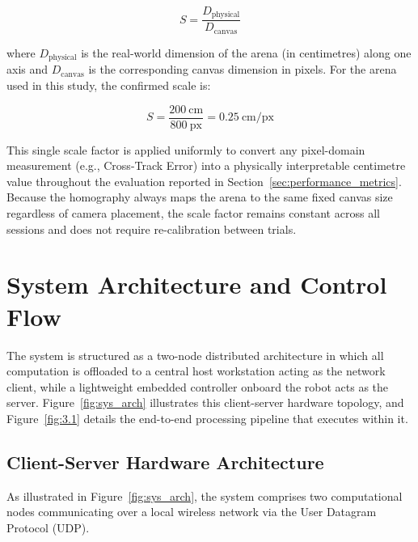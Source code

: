 \begin{equation}
    S = \frac{D_{\text{physical}}}{D_{\text{canvas}}}
    \label{eq:px_cm_scale}
\end{equation}

\noindent where $D_{\text{physical}}$ is the real-world dimension of the arena (in centimetres) along one axis
and $D_{\text{canvas}}$ is the corresponding canvas dimension in pixels. For the arena used in
this study, the confirmed scale is:

\begin{equation}
    S = \frac{200\ \text{cm}}{800\ \text{px}} = 0.25\ \text{cm/px}
    \label{eq:px_cm_value}
\end{equation}

This single scale factor is applied uniformly to convert any pixel-domain measurement
(e.g., Cross-Track Error) into a physically interpretable centimetre value throughout
the evaluation reported in Section~\ref{sec:performance_metrics}. Because the homography
always maps the arena to the same fixed canvas size regardless of camera placement, the
scale factor remains constant across all sessions and does not require re-calibration
between trials.

\section{System Architecture and Control Flow}

The system is structured as a two-node distributed architecture in which all computation is offloaded to a central host workstation acting as the network client, while a lightweight embedded controller onboard the robot acts as the server. Figure~\ref{fig:sys_arch} illustrates this client-server hardware topology, and Figure~\ref{fig:3.1} details the end-to-end processing pipeline that executes within it.

\subsection{Client-Server Hardware Architecture}

As illustrated in Figure~\ref{fig:sys_arch}, the system comprises two computational nodes communicating over a local wireless network via the User Datagram Protocol (UDP).


